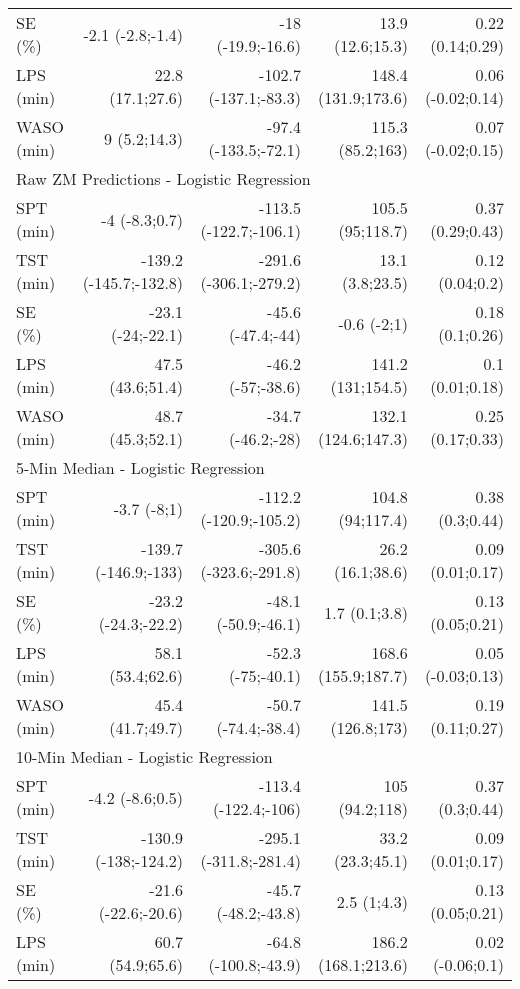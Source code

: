 \documentclass[
  9pt,
]{scrbook}
\begin{document}
\begin{longtable}{lrrrr}
SE (\%) & -2.1 (-2.8;-1.4) & -18 (-19.9;-16.6) & 13.9 (12.6;15.3) & 0.22 (0.14;0.29) \\ 
LPS (min) & 22.8 (17.1;27.6) & -102.7 (-137.1;-83.3) & 148.4 (131.9;173.6) & 0.06 (-0.02;0.14) \\ 
WASO (min) & 9 (5.2;14.3) & -97.4 (-133.5;-72.1) & 115.3 (85.2;163) & 0.07 (-0.02;0.15) \\ 
\midrule
\multicolumn{5}{l}{Raw ZM Predictions - Logistic Regression} \\ 
\midrule
SPT (min) & -4 (-8.3;0.7) & -113.5 (-122.7;-106.1) & 105.5 (95;118.7) & 0.37 (0.29;0.43) \\ 
TST (min) & -139.2 (-145.7;-132.8) & -291.6 (-306.1;-279.2) & 13.1 (3.8;23.5) & 0.12 (0.04;0.2) \\ 
SE (\%) & -23.1 (-24;-22.1) & -45.6 (-47.4;-44) & -0.6 (-2;1) & 0.18 (0.1;0.26) \\ 
LPS (min) & 47.5 (43.6;51.4) & -46.2 (-57;-38.6) & 141.2 (131;154.5) & 0.1 (0.01;0.18) \\ 
WASO (min) & 48.7 (45.3;52.1) & -34.7 (-46.2;-28) & 132.1 (124.6;147.3) & 0.25 (0.17;0.33) \\ 
\midrule
\multicolumn{5}{l}{5-Min Median - Logistic Regression} \\ 
\midrule
SPT (min) & -3.7 (-8;1) & -112.2 (-120.9;-105.2) & 104.8 (94;117.4) & 0.38 (0.3;0.44) \\ 
TST (min) & -139.7 (-146.9;-133) & -305.6 (-323.6;-291.8) & 26.2 (16.1;38.6) & 0.09 (0.01;0.17) \\ 
SE (\%) & -23.2 (-24.3;-22.2) & -48.1 (-50.9;-46.1) & 1.7 (0.1;3.8) & 0.13 (0.05;0.21) \\ 
LPS (min) & 58.1 (53.4;62.6) & -52.3 (-75;-40.1) & 168.6 (155.9;187.7) & 0.05 (-0.03;0.13) \\ 
WASO (min) & 45.4 (41.7;49.7) & -50.7 (-74.4;-38.4) & 141.5 (126.8;173) & 0.19 (0.11;0.27) \\ 
\midrule
\multicolumn{5}{l}{10-Min Median - Logistic Regression} \\ 
\midrule
SPT (min) & -4.2 (-8.6;0.5) & -113.4 (-122.4;-106) & 105 (94.2;118) & 0.37 (0.3;0.44) \\ 
TST (min) & -130.9 (-138;-124.2) & -295.1 (-311.8;-281.4) & 33.2 (23.3;45.1) & 0.09 (0.01;0.17) \\ 
SE (\%) & -21.6 (-22.6;-20.6) & -45.7 (-48.2;-43.8) & 2.5 (1;4.3) & 0.13 (0.05;0.21) \\ 
LPS (min) & 60.7 (54.9;65.6) & -64.8 (-100.8;-43.9) & 186.2 (168.1;213.6) & 0.02 (-0.06;0.1) \\ 

\end{longtable}
\end{document}
